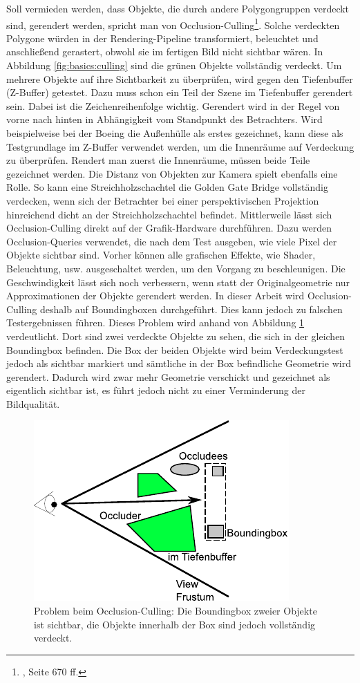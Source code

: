 Soll vermieden werden, dass Objekte, die durch andere Polygongruppen verdeckt sind, gerendert werden, spricht man von Occlusion-Culling\footnote{\cite{RTR3}, Seite 670 ff.}. Solche verdeckten Polygone würden in der Rendering-Pipeline transformiert, beleuchtet und anschließend gerastert, obwohl sie im fertigen Bild nicht sichtbar wären. In Abbildung \ref{fig:basics:culling} sind die grünen Objekte vollständig verdeckt. Um mehrere Objekte auf ihre Sichtbarkeit zu überprüfen, wird gegen den Tiefenbuffer (Z-Buffer) getestet. Dazu muss schon ein Teil der Szene im Tiefenbuffer gerendert sein. Dabei ist die Zeichenreihenfolge wichtig. Gerendert wird in der Regel von vorne nach hinten in Abhängigkeit vom Standpunkt des Betrachters. Wird beispielweise bei der Boeing die Außenhülle als erstes gezeichnet, kann diese als Testgrundlage im Z-Buffer verwendet werden, um die Innenräume auf Verdeckung zu überprüfen. Rendert man zuerst die Innenräume, müssen beide Teile gezeichnet werden. Die Distanz von Objekten zur Kamera spielt ebenfalls eine Rolle. So kann eine Streichholzschachtel die Golden Gate Bridge vollständig verdecken, wenn sich der Betrachter bei einer perspektivischen Projektion hinreichend dicht an der Streichholzschachtel befindet. Mittlerweile lässt sich Occlusion-Culling direkt auf der Grafik-Hardware durchführen. Dazu werden Occlusion-Queries verwendet, die nach dem Test ausgeben, wie viele Pixel der Objekte sichtbar sind. Vorher können alle grafischen Effekte, wie Shader, Beleuchtung, usw. ausgeschaltet werden, um den Vorgang zu beschleunigen. Die Geschwindigkeit lässt sich noch verbessern, wenn statt der Originalgeometrie nur Approximationen der Objekte gerendert werden. In dieser Arbeit wird Occlusion-Culling deshalb auf Boundingboxen durchgeführt. Dies kann jedoch zu falschen Testergebnissen führen. Dieses Problem wird anhand von Abbildung \ref{fig:basics:oculling} verdeutlicht. Dort sind zwei verdeckte Objekte zu sehen, die sich in der gleichen Boundingbox befinden. Die Box der beiden Objekte wird beim Verdeckungstest jedoch als sichtbar markiert und sämtliche in der Box befindliche Geometrie wird gerendert. Dadurch wird zwar mehr Geometrie verschickt und gezeichnet als eigentlich sichtbar ist, es führt jedoch nicht zu einer Verminderung der Bildqualität.
\begin{figure}
  \centering
  \includegraphics[scale=0.8]{images/oculling.pdf}
  \caption[Problem beim Occlusion-Culling]{\label{fig:basics:oculling}Problem beim Occlusion-Culling: Die Boundingbox zweier Objekte ist sichtbar, die Objekte innerhalb der Box sind jedoch vollständig verdeckt.}
\end{figure}

